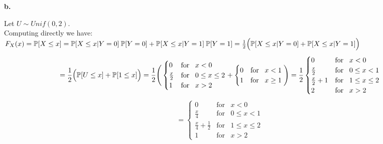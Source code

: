 \documentclass{article}
\begin{document}
{\Large\textbf{b.}}
\begin{center}
\doublespacing
    Let $U\sim Unif(0, 2)$.
    \\Computing directly we have:
    \\$F_X (x) =\mathbb{P}[X\leq x] =\mathbb{P}[X\leq x | Y = 0]\:\mathbb{P}[Y = 0] +\mathbb{P}[X\leq x | Y = 1]\:\mathbb{P}[Y = 1] =\frac{1}{2}\Big{(}\mathbb{P}[X\leq x | Y = 0] +\mathbb{P}[X\leq x | Y = 1]\Big{)}$
    \[=\frac{1}{2}\Big{(}\mathbb{P}[U\leq x] +\mathbb{P}[1\leq x]\Big{)} =\frac{1}{2}\Bigg{(}
    \begin{cases}
        0 & \mbox{for}\;\;\;x < 0 \\
        \frac{x}{2} & \mbox{for}\;\;\;0\leq x\leq 2 \\
        1 & \mbox{for}\;\;\;x > 2
    \end{cases}
    +
    \begin{cases}
        0 & \mbox{for}\;\;\;x < 1 \\
        1 & \mbox{for}\;\;\;x\geq 1
    \end{cases}
    \Bigg{)}
    =\frac{1}{2}
    \begin{cases}
        0 & \mbox{for}\;\;\;x < 0 \\
        \frac{x}{2} & \mbox{for}\;\;\;0\leq x < 1 \\
        \frac{x}{2} + 1 & \mbox{for}\;\;\;1\leq x\leq 2 \\
        2 & \mbox{for}\;\;\;x > 2
    \end{cases}
    \]
    \[=
    \begin{cases}
        0 & \mbox{for}\;\;\;x < 0 \\
        \frac{x}{4} & \mbox{for}\;\;\;0\leq x < 1 \\
        \frac{x}{4} +\frac{1}{2} & \mbox{for}\;\;\;1\leq x\leq 2 \\
        1 & \mbox{for}\;\;\;x > 2
    \end{cases}
    \]
\end{center}
\end{document}
